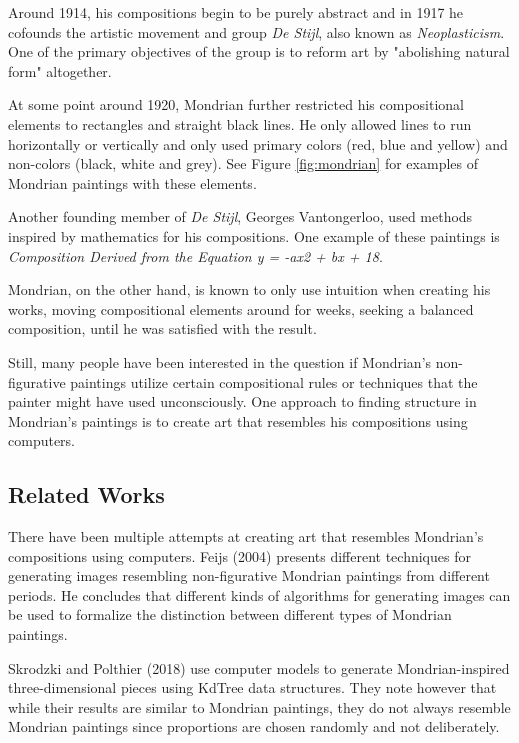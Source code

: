 \documentclass[serif,article,noparskip]{agse-thesis}
\begin{document}
Around 1914, his compositions begin to be purely abstract and in 1917 he cofounds
the artistic movement and group \textit{De Stijl}, also known as
\textit{Neoplasticism}. One of the primary objectives of the group is to reform
art by "abolishing natural form" \cite{wiki:manifest} altogether.

At some point around 1920, Mondrian further restricted his compositional
elements to rectangles and straight black lines. He only allowed lines to run
horizontally or vertically and only used primary colors (red, blue and yellow)
and non-colors (black, white and grey). See Figure \ref{fig:mondrian} for
examples of Mondrian paintings with these elements.

Another founding member of \textit{De Stijl}, Georges Vantongerloo, used methods
inspired by mathematics for his compositions. One example of these paintings is
\textit{Composition Derived from the Equation y = -ax2 + bx + 18}.

Mondrian, on the other hand, is known to only use intuition when creating his
works, moving compositional elements around for weeks, seeking a balanced
composition, until he was satisfied with the result.

Still, many people have been interested in the question if Mondrian's
non-figurative paintings utilize certain compositional rules or techniques that
the painter might have used unconsciously. One approach to finding structure in
Mondrian's paintings is to create art that resembles his compositions
using computers.

\subsection{Related Works}

There have been multiple attempts at creating art that resembles Mondrian's
compositions using computers. Feijs (2004) \cite{Feijs2004} presents different
techniques for generating images resembling non-figurative Mondrian paintings
from different periods. He concludes that different kinds of algorithms for
generating images can be used to formalize the distinction between different
types of Mondrian paintings.

Skrodzki and Polthier (2018) \cite{Skrodzki2018} use computer models to generate
Mondrian-inspired three-dimensional pieces using KdTree data structures. They
note however that while their results are similar to Mondrian paintings, they do
not always resemble Mondrian paintings since proportions are chosen randomly and
not deliberately.
\end{document}
